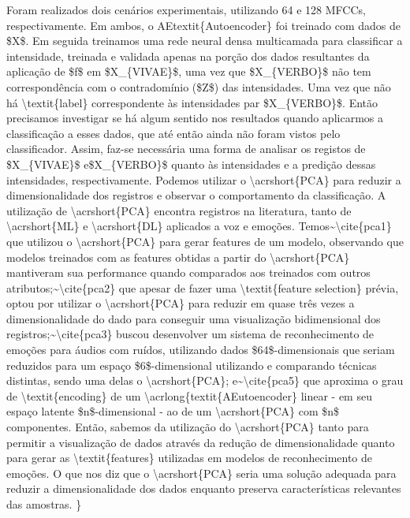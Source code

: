 Foram realizados dois cenários experimentais, utilizando 64 e 128 \acrshort{MFCC}s, respectivamente. Em ambos, o \acrlong{AEtextit{Autoencoder} foi treinado com dados de $X$. Em seguida treinamos uma rede neural densa multicamada para classificar a intensidade, treinada e validada apenas na porção dos dados resultantes da aplicação de $f$ em $X_{VIVAE}$, uma vez que $X_{VERBO}$ não tem correspondência com o contradomínio ($Z$) das intensidades.

Uma vez que não há \textit{label} correspondente às intensidades par $X_{VERBO}$. Então precisamos investigar se há algum sentido nos resultados quando aplicarmos a classificação a esses dados, que até então ainda não foram vistos pelo classificador.

Assim, faz-se necessária uma forma de analisar os registos de $X_{VIVAE}$ e$X_{VERBO}$ quanto às intensidades e a predição dessas intensidades, respectivamente. Podemos utilizar o \acrshort{PCA} para reduzir a dimensionalidade dos registros e observar o comportamento da classificação.

A utilização de \acrshort{PCA} encontra registros na literatura, tanto de \acrshort{ML} e \acrshort{DL} aplicados a voz e emoções. Temos~\cite{pca1} que utilizou o \acrshort{PCA} para gerar features de um modelo, observando que modelos treinados com as features obtidas a partir do \acrshort{PCA} mantiveram sua performance quando comparados aos treinados com outros atributos;~\cite{pca2} que apesar de fazer uma \textit{feature selection} prévia, optou por utilizar o \acrshort{PCA} para reduzir em quase três vezes a dimensionalidade do dado para conseguir uma visualização bidimensional dos registros;~\cite{pca3} buscou desenvolver um sistema de reconhecimento de emoções para áudios com ruídos, utilizando dados $64$-dimensionais que seriam reduzidos para um espaço $6$-dimensional utilizando e comparando técnicas distintas, sendo uma delas o \acrshort{PCA}; e~\cite{pca5} que aproxima o grau de \textit{encoding} de um \acrlong{textit{AEutoencoder} linear - em seu espaço latente $n$-dimensional - ao de um \acrshort{PCA} com $n$ componentes.

Então, sabemos  da utilização do \acrshort{PCA} tanto para permitir a visualização de dados através da redução de dimensionalidade quanto para gerar as \textit{features} utilizadas em modelos de reconhecimento de emoções. O que nos diz que o \acrshort{PCA} seria uma solução adequada para reduzir a dimensionalidade dos dados enquanto preserva características relevantes das amostras.


}}
